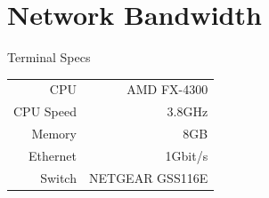 \section{Network Bandwidth}
\label{sec:bandwidth}


\begin{margintable}[-6.6cm]
\caption{Terminal Specs}
\label{tab:terminal}
\noindent\begin{tabularx}{\linewidth}{rR}
\toprule
    CPU & AMD FX-4300 \\
    CPU Speed & 3.8GHz \\
    Memory & 8GB \\
    Ethernet & 1Gbit/s \\
    Switch & NETGEAR GSS116E \\
\bottomrule
\end{tabularx}
\end{margintable}


